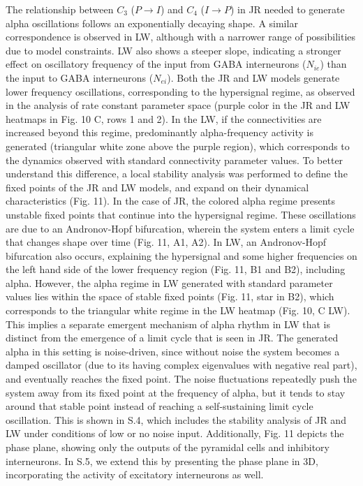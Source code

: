\documentclass[12pt,twoside]{article}
\begin{document}
The relationship between $C_{3}$ ($P \rightarrow I$) and $C_{4}$ ($I \rightarrow P$) in JR needed to generate alpha oscillations follows an exponentially decaying shape. A similar correspondence is observed in LW, although with a narrower range of possibilities due to model constraints. LW also shows a steeper slope, indicating a stronger effect on oscillatory frequency of the input from GABA interneurons ($N_{ie}$) than the input to GABA interneurons ($N_{ei}$). Both the JR and LW models generate lower frequency oscillations, corresponding to the hypersignal regime, as observed in the analysis of rate constant parameter space (purple color in the JR and LW heatmaps in Fig. 10 C, rows 1 and 2). In the LW, if the connectivities are increased beyond this regime, predominantly alpha-frequency activity is generated (triangular white zone above the purple region), which corresponds to the dynamics observed with standard connectivity parameter values. To better understand this difference, a local stability analysis was performed to define the fixed points of the JR and LW models, and expand on their dynamical characteristics (Fig. 11). In the case of JR, the colored alpha regime presents unstable fixed points that continue into the hypersignal regime. These oscillations are due to an Andronov-Hopf bifurcation, wherein the system enters a limit cycle that changes shape over time (Fig. 11, A1, A2). In LW, an Andronov-Hopf bifurcation also occurs, explaining the hypersignal and some higher frequencies on the left hand side of the lower frequency region (Fig. 11, B1 and B2), including alpha. However, the alpha regime in LW generated with standard parameter values lies within the space of stable fixed points (Fig. 11, star in B2), which corresponds to the triangular white regime in the LW heatmap (Fig. 10, C LW). This implies a separate emergent mechanism of alpha rhythm in LW that is distinct from the emergence of a limit cycle that is seen in JR. The generated alpha in this setting is noise-driven, since without noise the system becomes a damped oscillator (due to its having complex eigenvalues with negative real part), and eventually reaches the fixed point. The noise fluctuations repeatedly push the system away from its fixed point at the frequency of alpha, but it tends to stay around that stable point instead of reaching a self-sustaining limit cycle oscillation. This is shown in S.4, which includes the stability analysis of JR and LW under conditions of low or no noise input. Additionally, Fig. 11 depicts the phase plane, showing only the outputs of the pyramidal cells and inhibitory interneurons. In S.5, we extend this by presenting the phase plane in 3D, incorporating the activity of excitatory interneurons as well. 
\end{document}
